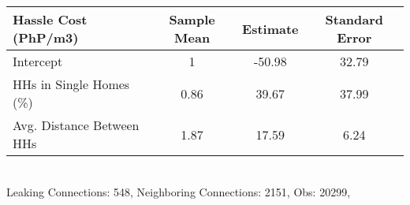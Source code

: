 \begin{tabular}{lccc}
Hassle Cost (PhP/m3) & Sample Mean & Estimate & Standard Error \\
\hline
\hline
Intercept & 1 &-50.98 &32.79\\
HHs in Single Homes (\%) &0.86&39.67&37.99\\
Avg. Distance Between HHs &1.87&17.59&6.24\\
\hline
\end{tabular} \\
\vspace{.5cm}
 Leaking Connections:  548,   Neighboring Connections:  2151,   Obs:  20299,
